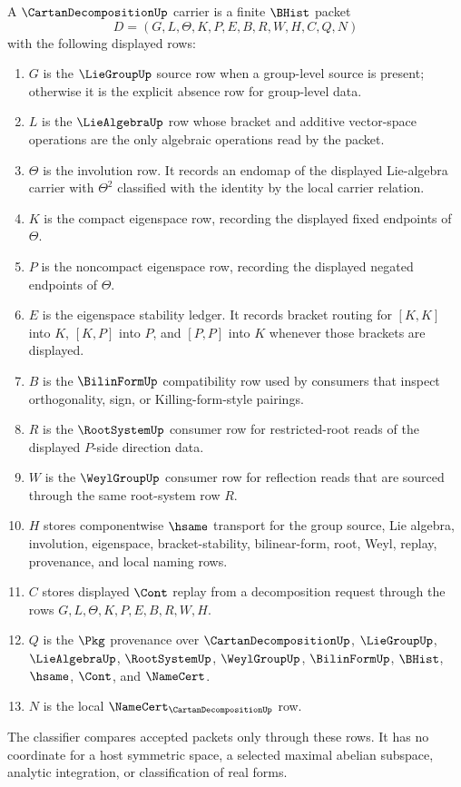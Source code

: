 \begin{definition}
\label{def:cartan-decomposition-carrier}
A $\CartanDecompositionUp$ carrier is a finite $\BHist$ packet
$$
D=(G,L,\Theta,K,P,E,B,R,W,H,C,Q,N)
$$
with the following displayed rows:
\begin{enumerate}
\item $G$ is the $\LieGroupUp$ source row when a group-level source is present; otherwise it is the explicit absence row for group-level data.
\item $L$ is the $\LieAlgebraUp$ row whose bracket and additive vector-space operations are the only algebraic operations read by the packet.
\item $\Theta$ is the involution row. It records an endomap of the displayed Lie-algebra carrier with $\Theta^2$ classified with the identity by the local carrier relation.
\item $K$ is the compact eigenspace row, recording the displayed fixed endpoints of $\Theta$.
\item $P$ is the noncompact eigenspace row, recording the displayed negated endpoints of $\Theta$.
\item $E$ is the eigenspace stability ledger. It records bracket routing for $[K,K]$ into $K$, $[K,P]$ into $P$, and $[P,P]$ into $K$ whenever those brackets are displayed.
\item $B$ is the $\BilinFormUp$ compatibility row used by consumers that inspect orthogonality, sign, or Killing-form-style pairings.
\item $R$ is the $\RootSystemUp$ consumer row for restricted-root reads of the displayed $P$-side direction data.
\item $W$ is the $\WeylGroupUp$ consumer row for reflection reads that are sourced through the same root-system row $R$.
\item $H$ stores componentwise $\hsame$ transport for the group source, Lie algebra, involution, eigenspace, bracket-stability, bilinear-form, root, Weyl, replay, provenance, and local naming rows.
\item $C$ stores displayed $\Cont$ replay from a decomposition request through the rows $G,L,\Theta,K,P,E,B,R,W,H$.
\item $Q$ is the $\Pkg$ provenance over $\CartanDecompositionUp$, $\LieGroupUp$, $\LieAlgebraUp$, $\RootSystemUp$, $\WeylGroupUp$, $\BilinFormUp$, $\BHist$, $\hsame$, $\Cont$, and $\NameCert$.
\item $N$ is the local $\NameCert_{\CartanDecompositionUp}$ row.
\end{enumerate}
The classifier compares accepted packets only through these rows. It has no coordinate for a host symmetric space, a selected maximal abelian subspace, analytic integration, or classification of real forms.
\end{definition}

